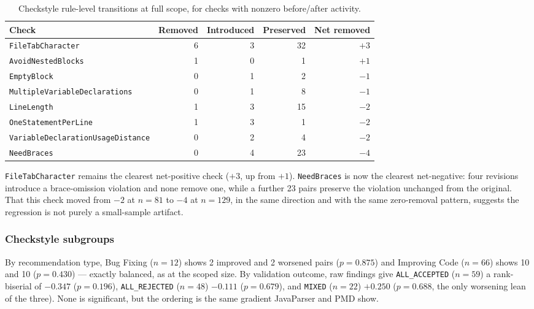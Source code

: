 \begin{table}[htbp]
\centering
\caption{Checkstyle rule-level transitions at full scope, for checks with nonzero before/after activity.}
\label{tab:ba-full-checkstyle-rules}
\small
\begin{tabular}{lrrrr}
\toprule
Check & Removed & Introduced & Preserved & Net removed \\
\midrule
\texttt{FileTabCharacter}                  & 6 & 3 & 32 & $+3$ \\
\texttt{AvoidNestedBlocks}                 & 1 & 0 & 1  & $+1$ \\
\texttt{EmptyBlock}                        & 0 & 1 & 2  & $-1$ \\
\texttt{MultipleVariableDeclarations}      & 0 & 1 & 8  & $-1$ \\
\texttt{LineLength}                        & 1 & 3 & 15 & $-2$ \\
\texttt{OneStatementPerLine}               & 1 & 3 & 1  & $-2$ \\
\texttt{VariableDeclarationUsageDistance}  & 0 & 2 & 4  & $-2$ \\
\texttt{NeedBraces}                        & 0 & 4 & 23 & $-4$ \\
\bottomrule
\end{tabular}
\end{table}

\texttt{FileTabCharacter} remains the clearest net-positive check ($+3$, up from $+1$).
\texttt{NeedBraces} is now the clearest net-negative: four revisions introduce a brace-omission violation and none remove one, while a further 23 pairs preserve the violation unchanged from the original.
That this check moved from $-2$ at $n=81$ to $-4$ at $n=129$, in the same direction and with the same zero-removal pattern, suggests the regression is not purely a small-sample artifact.

\subsubsection*{Checkstyle subgroups}

By recommendation type, Bug Fixing ($n=12$) shows 2 improved and 2 worsened pairs ($p=0.875$) and Improving Code ($n=66$) shows 10 and 10 ($p=0.430$) --- exactly balanced, as at the scoped size.
By validation outcome, raw findings give \texttt{ALL\_ACCEPTED} ($n=59$) a rank-biserial of $-0.347$ ($p=0.196$), \texttt{ALL\_REJECTED} ($n=48$) $-0.111$ ($p=0.679$), and \texttt{MIXED} ($n=22$) $+0.250$ ($p=0.688$, the only worsening lean of the three).
None is significant, but the ordering is the same gradient JavaParser and PMD show.

